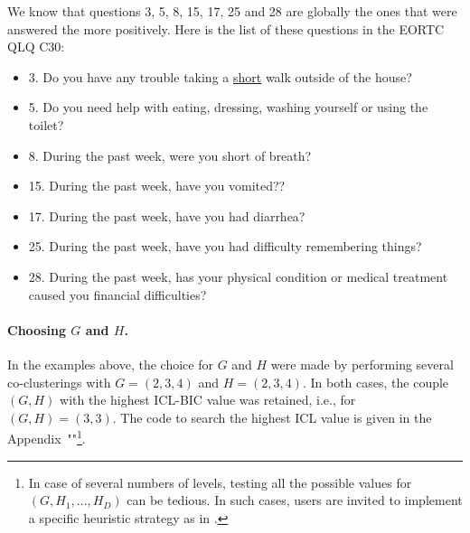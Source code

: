 We know that questions 3, 5, 8, 15, 17, 25 and 28 are globally the ones that were answered the more positively. Here is the list of these questions in the EORTC QLQ C30:
\begin{itemize}
\item 3. Do you have any trouble taking a \underline{short} walk outside of the house?
\item 5. Do you need help with eating, dressing, washing yourself or using the toilet?
\item 8. During the past week, were you short of breath?
\item 15. During the past week, have you vomited??
\item 17. During the past week, have you had diarrhea?
\item 25. During the past week, have you had difficulty remembering things?
\item 28. During the past week, has your physical condition or medical treatment caused you financial difficulties?
\end{itemize}

\paragraph{Choosing $G$ and $H$.} 
In the examples above, the choice for $G$ and $H$ were made by performing several co-clusterings with $G=(2,3,4)$ and $H=(2,3,4)$. In both cases, the couple $(G,H)$ with the highest ICL-BIC value was retained, i.e., for $(G,H)=(3,3)$. The code to search the highest ICL value is given in the Appendix~""\footnote{In case of several numbers of levels, testing all the possible values for $(G,H_{1},...,H_{D})$ can be tedious. In such cases, users are invited to implement a specific heuristic strategy as in \citet{Selosse18}.}.

